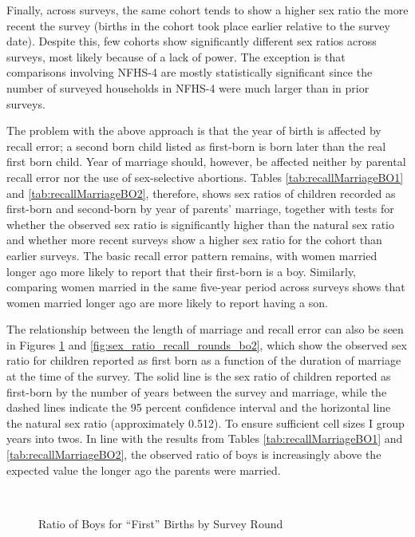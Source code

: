 \documentclass[12pt,letterpaper]{article}
\begin{document}
Finally, across surveys, the same cohort tends to show a higher sex ratio the more recent 
the survey (births in the cohort took place earlier relative to the survey date).
Despite this, few cohorts show significantly different sex ratios across surveys, most 
likely because of a lack of power.
The exception is that comparisons involving NFHS-4 are mostly statistically significant
since the number of surveyed households in NFHS-4 were much larger than in prior surveys.

The problem with the above approach is that the year of birth is affected by recall error; 
a second born child listed as first-born is born later than the real first born child.
Year of marriage should, however, be affected neither by parental recall error 
nor the use of sex-selective abortions.
Tables \ref{tab:recallMarriageBO1} and \ref{tab:recallMarriageBO2}, therefore, shows sex 
ratios of children recorded as first-born and second-born by year of parents' marriage, 
together with tests for whether the observed sex ratio is significantly higher than the 
natural sex ratio and whether more recent surveys show a higher sex ratio for the cohort 
than earlier surveys.
The basic recall error pattern remains, with women married longer ago more
likely to report that their first-born is a boy.
Similarly, comparing women married in the same five-year period across surveys shows
that women married longer ago are more likely to report having a son.







The relationship between the length of marriage and recall error can also be seen in 
Figures \ref{fig:sex_ratio_recall_rounds_bo1} and \ref{fig:sex_ratio_recall_rounds_bo2}, 
which show the observed sex ratio for children reported as first born as a function of 
the duration of marriage at the time of the survey.
The solid line is the sex ratio of children reported as first-born by the number of years 
between the survey and marriage, while the dashed lines indicate the 95 percent confidence 
interval and the horizontal line the natural sex ratio (approximately 0.512).
To ensure sufficient cell sizes I group years into twos.
In line with the results from Tables \ref{tab:recallMarriageBO1} and 
\ref{tab:recallMarriageBO2}, the observed ratio of boys is increasingly above the expected 
value the longer ago the parents were married.

\begin{figure}
\centering
{}
 \\
\caption{Ratio of Boys for ``First'' Births by Survey Round}
\label{fig:sex_ratio_recall_rounds_bo1}
\end{figure}
\end{document}

